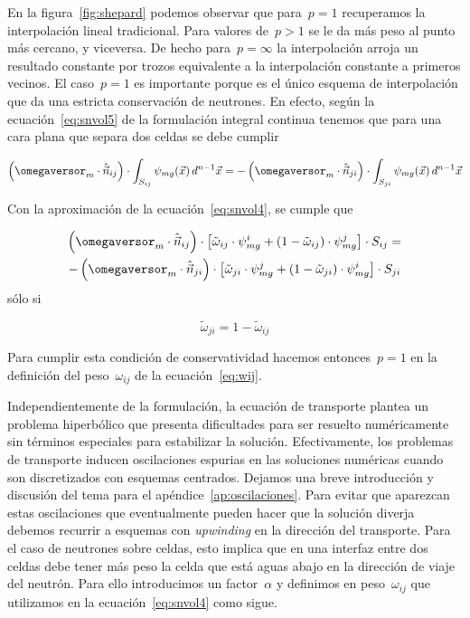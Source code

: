 En la figura~\ref{fig:shepard} podemos observar que para~$p=1$ recuperamos la interpolación lineal tradicional. Para valores de~$p>1$ se le da más peso al punto más cercano, y viceversa. De hecho para~$p=\infty$ la interpolación arroja un resultado constante por trozos equivalente a la interpolación constante a primeros vecinos. El caso~$p=1$ es importante porque es el único esquema de interpolación que da una estricta conservación de neutrones. En efecto, según la ecuación~\eqref{eq:snvol5} de la formulación integral continua tenemos que para una cara plana que separa dos celdas se debe cumplir

\begin{equation*}
  \left( \omegaversor_m \cdot \hat{\vec{n}}_{ij}\right) \cdot \int_{S_{ij}} \psi_{mg}(\vec{x})  \, d^{n-1}\vec{x}
=
- \left( \omegaversor_m \cdot \hat{\vec{n}}_{ji}\right) \cdot \int_{S_{ji}} \psi_{mg}(\vec{x})  \, d^{n-1}\vec{x}
\end{equation*}

Con la aproximación de la ecuación~\eqref{eq:snvol4}, se cumple que


\begin{multline*}
  \left( \omegaversor_m \cdot \hat{\vec{n}}_{ij}\right) \cdot  \left[ \tilde{\omega}_{ij} \cdot \psi_{mg}^i + (1-\tilde{\omega}_{ij}) \cdot \psi_{mg}^j \right] \cdot S_{ij} 
= \\
- \left( \omegaversor_m \cdot \hat{\vec{n}}_{ji}\right) \cdot  \left[ \tilde{\omega}_{ji} \cdot \psi_{mg}^j + (1-\tilde{\omega}_{ji}) \cdot \psi_{mg}^i \right] \cdot S_{ji} 
\end{multline*}
%
sólo si

\begin{equation*}
 \tilde{\omega}_{ji} = 1 - \tilde{\omega}_{ij}
\end{equation*}

Para cumplir esta condición de conservatividad hacemos entonces~$p=1$ en la definición del peso~$\omega_{ij}$ de la ecuación~\eqref{eq:wij}.

\medskip

Independientemente de la formulación, la ecuación de transporte plantea un problema hiperbólico que presenta dificultades para ser resuelto numéricamente sin términos especiales para estabilizar la solución. Efectivamente, los problemas de transporte inducen oscilaciones espurias en las soluciones numéricas cuando son discretizados con esquemas centrados. Dejamos una breve introducción y discusión del tema para el apéndice~\ref{ap:oscilaciones}. Para evitar que aparezcan estas oscilaciones que eventualmente pueden hacer que la solución diverja debemos recurrir a esquemas con \emph{upwinding} en la dirección del transporte. Para el caso de neutrones sobre celdas, esto implica que en una interfaz entre dos celdas debe tener más peso la celda que está aguas abajo en la dirección de viaje del neutrón. Para ello introducimos un factor~$\alpha$ y definimos en peso~$\omega_{ij}$ que utilizamos en la ecuación~\eqref{eq:snvol4} como sigue.

